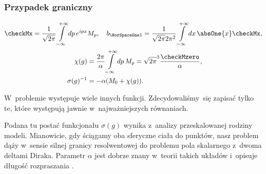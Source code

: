 \documentclass[10pt,t]{beamer}
\begin{document}
\begin{frame}
  \frametitle{Przypadek graniczny}

  \vspace{-2em}



  \begin{subequations}

    \begin{align}
      \label{eq:Pole-skalarne-ETC-03-A}
      \checkMx =
        \frac{ 1 }{ \sqrt{ 2 \pi } }
      \int\limits_{ -\infty }^{ +\infty } dp \, e^{ i p x }
      &M_{ p }, \quad
        b_{ \HorSpaceOne 1 } =
        \frac{ 1 }{ \sqrt{ 2 \pi } 2 \pi^{ 2 } }
        \int\limits_{ -\infty }^{ +\infty } dx \, \absOne{ x } \checkMx, \\
      \label{eq:Pole-skalarne-ETC-03-B}
      \chi( g )
      &=
        \frac{ 2 \pi }{ \alpha }
        \int\limits_{ -\infty }^{ +\infty } dp \, M_{ p } =
        \sqrt{ 2 \pi }^{ 3 } \frac{ \checkMzero }{ \alpha }, \\
      \label{eq:Pole-skalarne-ETC-03-C}
      \sigma( g )^{ -1 }
      &=
        -\alpha ( M_{ 0 } + \chi( g ) ).
    \end{align}

  \end{subequations}

  \vspace{-1.8em}



  W~problemie występuje wiele innych funkcji. Zdecydowaliśmy~się zapisać
  tylko te, które występują jawnie w~najważniejszych równaniach.

  Podana tu postać funkcjonału $\sigma( g )$ wynika z~analizy przeskalowanej
  rodziny modeli. Mianowicie, gdy ściągamy oba sferyczne ciała do punktów,
  nasz problem dąży w~sensie silnej granicy resolwentowej do problemu
  pola skalarnego z~dwoma deltami Diraka. Parametr $\alpha$ jest dobrze znany
  w~teorii takich układów i~opisuje długość rozpraszania
  \parencite{Albeverio-et-al-Solvable-Models-in-Quantum-Mechanics-Pub-1988}.

\end{frame}
\end{document}
